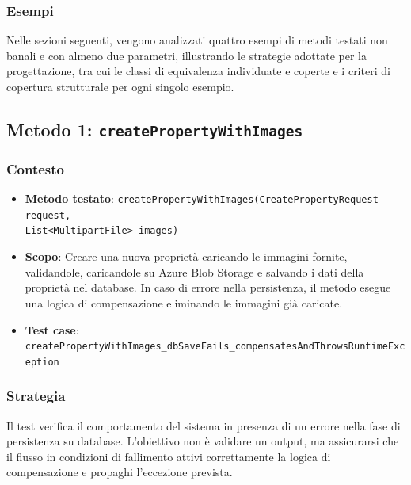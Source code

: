\documentclass{book}
\begin{document}
\subsubsection{Esempi}
Nelle sezioni seguenti, vengono analizzati quattro esempi di metodi testati non banali e con almeno due parametri, illustrando le strategie adottate per la progettazione, tra cui le classi di equivalenza individuate e coperte e i criteri di copertura strutturale per ogni singolo esempio.
\clearpage

\subsection{Metodo 1: \texttt{createPropertyWithImages}}

\subsubsection{Contesto}
\begin{itemize}
\item \textbf{Metodo testato}: \texttt{createPropertyWithImages(CreatePropertyRequest request,\\
 List<MultipartFile> images)}
\item \textbf{Scopo}: Creare una nuova proprietà caricando le immagini fornite, validandole, caricandole su Azure Blob Storage e salvando i dati della proprietà nel database. In caso di errore nella persistenza, il metodo esegue una logica di compensazione eliminando le immagini già caricate.
\item \textbf{Test case}: \texttt{createPropertyWithImages\_dbSaveFails\_compensatesAndThrowsRuntimeException}
\end{itemize}

\subsubsection{Strategia}
Il test verifica il comportamento del sistema in presenza di un errore nella fase di persistenza su database. L’obiettivo non è validare un output, ma assicurarsi che il flusso in condizioni di fallimento attivi correttamente la logica di compensazione e propaghi l’eccezione prevista.
\end{document}
